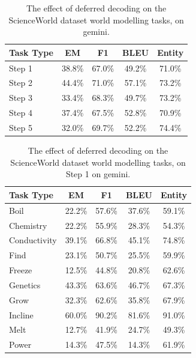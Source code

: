 \begin{table}[h]
\centering
    \setlength\tabcolsep{15pt}
    \setlength\extrarowheight{0pt}
\caption{The effect of deferred decoding on the ScienceWorld dataset \citep{wang-etal-2022-scienceworld} world modelling tasks, on gemini.}
\label{tab:scienceworld29}
\begin{tabular}{lcccc}
\toprule
\textbf{Task Type} & \textbf{EM} & \textbf{F1}
  & \textbf{BLEU} & \textbf{Entity}\\
\midrule
Step 1 & 38.8\% & 67.0\% & 49.2\% & 71.0\% \\
Step 2 & 44.4\% & 71.0\% & 57.1\% & 73.2\% \\
Step 3 & 33.4\% & 68.3\% & 49.7\% & 73.2\% \\
Step 4 & 37.4\% & 67.5\% & 52.8\% & 70.9\% \\
Step 5 & 32.0\% & 69.7\% & 52.2\% & 74.4\% \\

\bottomrule
\end{tabular}
\end{table}


\begin{table}[h]
\centering
    \setlength\tabcolsep{15pt}
    \setlength\extrarowheight{0pt}
\caption{The effect of deferred decoding on the ScienceWorld dataset \citep{wang-etal-2022-scienceworld} world modelling tasks, on Step 1 on gemini.}
\label{tab:scienceworld30}
\begin{tabular}{lcccc}
\toprule
\textbf{Task Type} & \textbf{EM} & \textbf{F1}
  & \textbf{BLEU} & \textbf{Entity}\\
\midrule
Boil & 22.2\% & 57.6\% & 37.6\% & 59.1\% \\
Chemistry & 22.2\% & 55.9\% & 28.3\% & 54.3\% \\
Conductivity & 39.1\% & 66.8\% & 45.1\% & 74.8\% \\
Find & 23.1\% & 50.7\% & 25.5\% & 59.9\% \\
Freeze & 12.5\% & 44.8\% & 20.8\% & 62.6\% \\
Genetics & 43.3\% & 63.6\% & 46.7\% & 67.3\% \\
Grow & 32.3\% & 62.6\% & 35.8\% & 67.9\% \\
Incline & 60.0\% & 90.2\% & 81.6\% & 91.0\% \\
Melt & 12.7\% & 41.9\% & 24.7\% & 49.3\% \\
Power & 14.3\% & 47.5\% & 14.3\% & 61.9\% \\

\bottomrule
\end{tabular}
\end{table}


